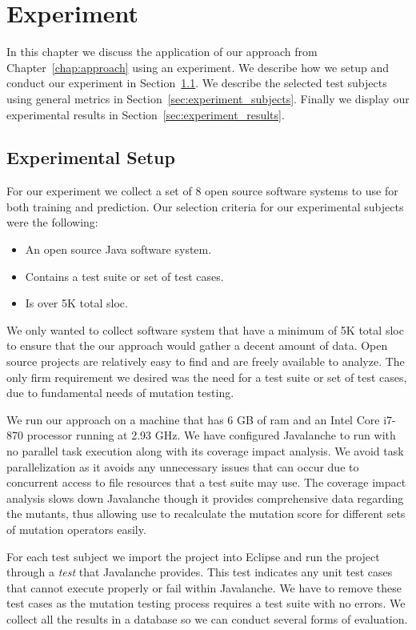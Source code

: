 \chapter{Experiment}
\label{chap:experiment}
In this chapter we discuss the application of our approach from Chapter~\ref{chap:approach} using an experiment. We describe how we setup and conduct our experiment in Section~\ref{sec:experiment_setup}. We describe the selected test subjects using general metrics in Section~\ref{sec:experiment_subjects}. Finally we display our experimental results in Section~\ref{sec:experiment_results}.


\section{Experimental Setup}
\label{sec:experiment_setup}
For our experiment we collect a set of 8 open source software systems to use for both training and prediction. Our selection criteria for our experimental subjects were the following:

\begin{itemize}
  \item An open source Java software system.
  \item Contains a test suite or set of test cases.
  \item Is over 5K total \gls{sloc}.
\end{itemize}

We only wanted to collect software system that have a minimum of 5K total \gls{sloc} to ensure that the our approach would gather a decent amount of data. Open source projects are relatively easy to find and are freely available to analyze. The only firm requirement we desired was the need for a test suite or set of test cases, due to fundamental needs of mutation testing.

We run our approach on a machine that has 6 GB of \gls{ram} and an Intel Core i7-870 processor running at 2.93 GHz. We have configured Javalanche to run with no parallel task execution along with its coverage impact analysis. We avoid task parallelization as it avoids any unnecessary issues that can occur due to concurrent access to file resources that a test suite may use. The coverage impact analysis slows down Javalanche though it provides comprehensive data regarding the mutants, thus allowing use to recalculate the mutation score for different sets of mutation operators easily.

For each test subject we import the project into Eclipse and run the project through a \emph{test} that Javalanche provides. This test indicates any unit test cases that cannot execute properly or fail within Javalanche. We have to remove these test cases as the mutation testing process requires a test suite with no errors. We collect all the results in a database so we can conduct several forms of evaluation.


